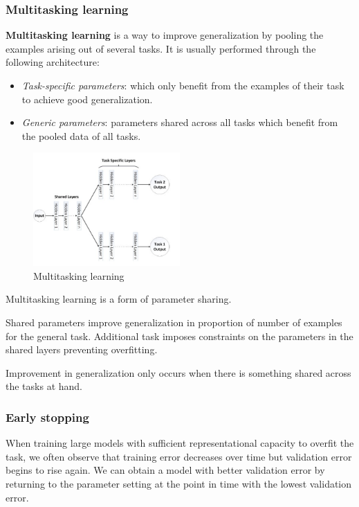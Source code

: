 \subsubsection{Multitasking learning}
\textbf{Multitasking learning} is a way to improve generalization by pooling the
examples arising out of several tasks. It is usually performed through the
following architecture:
\begin{itemize}
    \item \textit{Task-specific parameters}: which only benefit from the examples
          of their task to achieve good generalization.
    \item \textit{Generic parameters}: parameters shared across all tasks which
          benefit from the pooled data of all tasks.
\end{itemize}
\begin{figure}[!ht]
    \centering
    \includegraphics[width=0.5\textwidth]{img/multitask.png}
    \caption{Multitasking learning}
    \label{fig:multitask}
\end{figure}
\begin{note}
    Multitasking learning is a form of parameter sharing.
\end{note}

Shared parameters improve generalization in proportion of number of examples for
the general task. Additional task imposes constraints on the parameters in the
shared layers preventing overfitting.
\begin{note}
    Improvement in generalization only occurs when there is something shared across
    the tasks at hand.
\end{note}
\subsubsection{Early stopping}
When training large models with sufficient representational capacity to overfit
the task, we often observe that training error decreases over time but validation
error begins to rise again. We can obtain a model with better validation error by
returning to the parameter setting at the point in time with the lowest validation
error.

